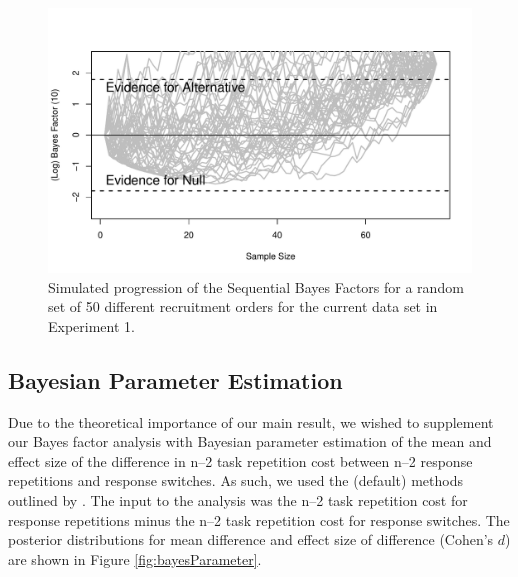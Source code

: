 \documentclass[a4paper, doc, natbib]{apa6}
\begin{document}
\begin{figure}
\begin{center}
\includegraphics[width =  \textwidth]{Images/recruitmentOrder.pdf}
\caption{Simulated progression of the Sequential Bayes Factors for a random set of 50 different recruitment orders for the current data set in Experiment 1.}
\label{fig:recruitmentOrder}
\end{center}
\end{figure}

\subsection{Bayesian Parameter Estimation}
Due to the theoretical importance of our main result, we wished to supplement our Bayes factor analysis with Bayesian parameter estimation of the mean and effect size of the difference in n--2 task repetition cost between n--2 response repetitions and response switches. As such, we used the (default) methods outlined by \cite{Kruschke2013}. The input to the analysis was the n--2 task repetition cost for response repetitions minus the n--2 task repetition cost for response switches. The posterior distributions for mean difference and effect size of difference (Cohen's $d$) are shown in Figure \ref{fig:bayesParameter}.
\end{document}
